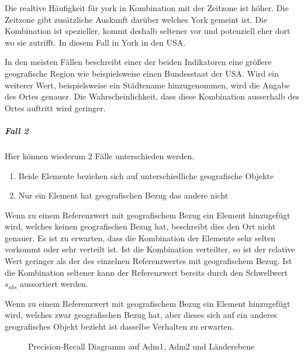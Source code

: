 							Die realtive Häufigkeit für york in Kombination mit der Zeitzone ist höher. 
							Die Zeitzone gibt zusätzliche Auskunft darüber welches York gemeint ist. 
							Die Kombination ist spezieller, kommt deshalb seltener vor und potenziell eher dort wo sie zutrifft. 
							In diesem Fall in York in den USA. 

							In den meisten Fällen beschreibt einer der beiden Indikatoren eine größere geografische Region wie beispielsweise einen Bundesstaat der USA.
							Wird ein weiterer Wert, beispielsweise ein Städtename hinzugenommen, wird die Angabe des Ortes genauer. 
							Die Wahrscheinlichkeit, dass diese Kombination ausserhalb des Ortes auftritt wird geringer. 

					\subparagraph{Fall 2}

						Hier können wiederum 2 Fälle unterschieden werden.

						\begin{enumerate}
							\item Beide Elemente beziehen sich auf unterschiedliche geografische Objekte
							\item Nur ein Element hat geografischen Bezug das andere nicht 
						\end{enumerate}

						Wenn zu einem Referenzwert mit geografischem Bezug ein Element hinzugefügt wird, welches keinen geografischen Bezug hat, beschreibt dies den Ort nicht genauer.
						Es ist zu erwarten, dass die Kombination der Elemente sehr selten vorkommt oder sehr verteilt ist. 
						Ist die Kombination verteilter, so ist der relative Wert geringer als der des einzelnen Referenzwertes mit geografischem Bezug.
						Ist die Kombination seltener kann der Referenzwert bereits durch den Schwellwert $s_{abs}$ aussortiert werden.		

						Wenn zu einem Referenzwert mit geografischem Bezug ein Element hinzugefügt wird, welches zwar geografischen Bezug hat, aber dieses sich auf ein anderes geografisches Objekt bezieht ist dasselbe Verhalten zu erwarten.



	\begin{figure}[!ht]
	
						\centering
						\caption{Precision-Recall Diagramm auf Adm1, Adm2 und Länderebene}
						\label{img:relHaufBsp}
					
				\end{figure}





